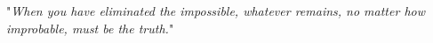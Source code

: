 \tableofcontents
\listoffigures
\listoftables

\pagebreak
\thispagestyle{empty}
\hspace{0pt}
\vfill
\begin{flushright}
"\textit{When you have eliminated the impossible, whatever remains, no matter how improbable, must be the truth.}"
\\[8pt]
\end{flushright}
\vfill
\hspace{0pt}
\pagebreak




